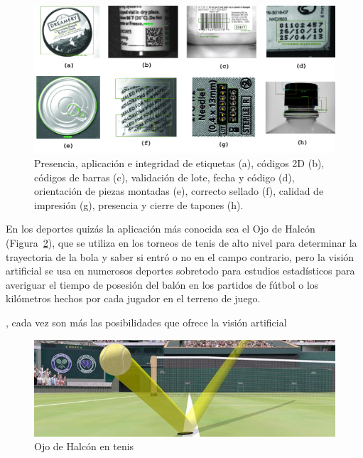 \begin{figure}[th]
\centering
\includegraphics[scale=0.17]{Figures/industry.png}
\decoRule
\caption[Industry]{Presencia, aplicación e integridad de etiquetas (a), códigos 2D (b), códigos de barras (c), validación de lote, fecha y código (d), orientación de piezas montadas (e), correcto sellado (f), calidad de impresión (g), presencia y cierre de tapones (h). }
\label{fig:Industry}
\end{figure}

En los deportes quizás la aplicación más conocida sea el Ojo de Halcón (Figura~\ref{fig:Ojohalcon}), que se utiliza en los torneos de tenis de alto nivel para determinar la trayectoria de la bola y saber si entró o no en el campo contrario, pero la visión artificial se usa en numerosos deportes sobretodo para estudios estadísticos para averiguar el tiempo de posesión del balón en los partidos de fútbol o los kilómetros hechos por cada jugador en el terreno de juego.



, cada vez son más las posibilidades que ofrece la visión artificial 

\begin{figure}[th]
\centering
\includegraphics[scale=0.6]{Figures/ojohalcon.jpg}
\decoRule
\caption[Ojohalcon]{Ojo de Halcón en tenis}
\label{fig:Ojohalcon}
\end{figure}

